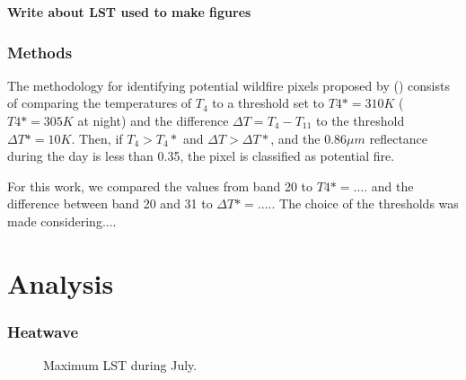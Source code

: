 \documentclass[a4paper, article, oneside, UKenglish]{memoir}
\newcommand{\0}{\mathbf{0}}
\newcommand{\1}{\mathbf{1}}
\begin{document}
\textbf{Write about LST used to make figures}
\subsection{Methods}

The methodology for identifying potential wildfire pixels proposed by \citeauthor{2018_sweden_wildfires} (\citeyear{giglio_et_al_2016}) consists of comparing the temperatures of $T_4$ to a threshold set to $T4* = 310 K$ ($T4* = 305 K$ at night) and the difference $\Delta T = T_4 - T_{11}$ to the threshold $\Delta T* = 10 K$. Then, if $T_4 > T_4*$ and $\Delta T > \Delta T *$, and the $0.86 \mu m$ reflectance during the day is less than 0.35, the pixel is classified as potential fire. 

For this work, we compared the values from band 20 to $T4* = ....$ and the difference between band 20 and 31 to $\Delta T* = ....$. The choice of the thresholds was made considering....

\chapter{Analysis}

\subsection{Heatwave}

\begin{figure}[!tbp]
  \centering
  \hfill
  \caption{Maximum LST during July.}
\end{figure}
\end{document}
